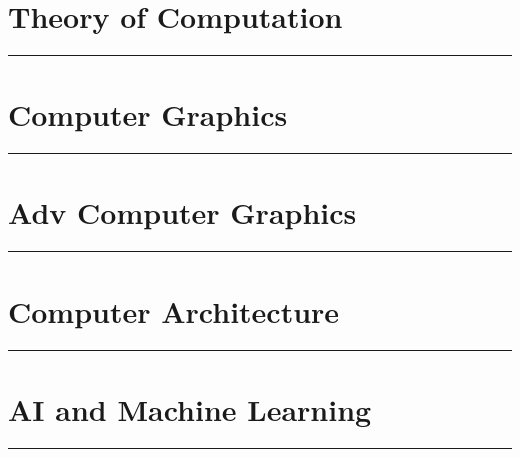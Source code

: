 \documentclass[10pt,titlepage]{asmath}
\newcommand{\hdiv}[3]{
  \vspace{#1}%
  \noindent\rule{\textwidth}{#2}%
  \vspace{#3}%
}
\theoremstyle{definition}
\begin{document}
\newpage
\part{Theory of Computation}
\label{prt:theory_of_computation}
\hdiv{10pt}{2pt}{10pt}
\begin{multicols}{2}
  
\end{multicols}

\newpage
\part{Computer Graphics}
\label{prt:computer_graphics}
\hdiv{10pt}{2pt}{10pt}
\begin{multicols}{2}
  
\end{multicols}

\newpage
\part{Adv Computer Graphics}
\label{prt:adv_computer_graphics}
\hdiv{10pt}{2pt}{10pt}
\begin{multicols}{2}
  
\end{multicols}

\newpage
\part{Computer Architecture}
\label{prt:computer_architecture}
\hdiv{10pt}{2pt}{10pt}
\begin{multicols}{2}
  
\end{multicols}

\newpage
\part{AI and Machine Learning}
\label{prt:ai_and_machine_learning}
\hdiv{10pt}{2pt}{10pt}
\begin{multicols}{2}
  
\end{multicols}
\end{document}
